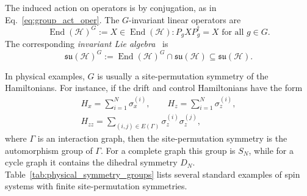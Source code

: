 \documentclass[10pt,twocolumn,superscriptaddress,aps,amsmath,amssymb,citeautoscript,floatfix,prx,longbibliography]{revtex4-2}
\newcounter{alg}
\theoremstyle{plain}
\theoremstyle{plain}
\theoremstyle{plain}
\theoremstyle{plain}
\theoremstyle{plain}
\theoremstyle{plain}
\begin{document}
The induced action on operators is by conjugation, as in Eq.~\eqref{eq:group_act_oper}. The $G$-invariant linear operators are
$$
\operatorname{End}(\mathcal H)^G
:=
{
X\in\operatorname{End}(\mathcal H):
P_gXP_g^\dagger=X
\text{ for all } g\in G
}.
$$
The corresponding \textit{invariant Lie algebra}~\cite{DAlessandroHartwig2021, Albertini2020} is
$$
\mathfrak{su}(\mathcal H)^G
:=
\operatorname{End}(\mathcal H)^G
\cap
\mathfrak{su}(\mathcal H)
\subseteq
\mathfrak{su}(\mathcal H).
$$

In physical examples, $G$ is usually a site-permutation symmetry of the Hamiltonians. For instance, if the drift and control Hamiltonians have the form
$$
\begin{gathered}
H_x
=
\sum_{i=1}^N\sigma_x^{(i)},
\qquad
H_z
=
\sum_{i=1}^N\sigma_z^{(i)},
\\
H_{zz}
=
\sum_{(i,j)\in E(\Gamma)}
\sigma_z^{(i)}\sigma_z^{(j)},
\end{gathered}
$$
where $\Gamma$ is an interaction graph, then the site-permutation symmetry is the automorphism group of $\Gamma$. For a complete graph this group is $S_N$, while for a cycle graph it contains the dihedral symmetry $D_N$. Table~\ref{tab:physical_symmetry_groups} lists several standard examples of spin systems with finite site-permutation symmetries.
\end{document}
